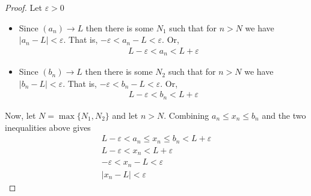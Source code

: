 \documentclass{article}
\begin{document}
\begin{proof}
	Let $\varepsilon > 0$

	\begin{itemize}
		\item Since $(a_n) \rightarrow L$ then there is some $N_1$ such that for $n > N$ we have $|a_n - L| < \varepsilon$. That is,
		      $- \varepsilon < a_n - L < \varepsilon$. Or,
		      \begin{align*}
			      L - \varepsilon < a_n < L + \varepsilon
		      \end{align*}
		\item Since $(b_n) \rightarrow L$ then there is some $N_2$ such that for $n > N$ we have $|b_n - L| < \varepsilon$. That is,
		      $- \varepsilon < b_n - L < \varepsilon$. Or,
		      \begin{align*}
			      L - \varepsilon < b_n < L + \varepsilon
		      \end{align*}
	\end{itemize}

	Now, let $N = \max\{N_1, N_2\}$ and let $n > N$. Combining $a_n \le x_n \le b_n$ and the two inequalities above gives
	\begin{gather*}
		L - \varepsilon < a_n \le x_n \le b_n < L + \varepsilon \\
		L - \varepsilon       <         x_n < L + \varepsilon   \\
		-\varepsilon          <        x_n - L < \varepsilon    \\
		|x_n - L|             < \varepsilon
	\end{gather*}

\end{proof}
\end{document}
